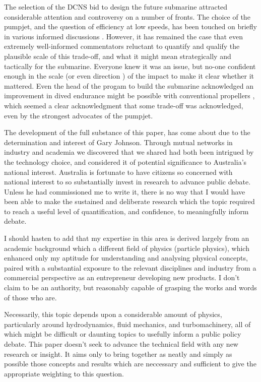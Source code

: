 \documentclass{article}\usepackage[]{graphicx}\usepackage[]{color}
\begin{document}
The selection of the DCNS bid to design the future submarine attracted considerable attention and controversy on a number of fronts. The choice of the pumpjet, and the question of efficiency at low speeds, has been touched on briefly in various informed discussions \parencite{stanford2017} \parencite{davies2017}.  However, it has remained the case that even extremely well-informed commentators reluctant to quantify and qualify the plausible scale of this trade-off, and what it might mean strategically and tactically for the submarine. Everyone knew it was an issue, but no-one confident enough in the scale (or even direction \parencite{davies2017}) of the impact to make it clear whether it mattered. Even the head of the progam to build the submarine acknowledged an improvement in dived endurance might be possible with conventional propellers \parencite{sbs2017}, which seemed a clear acknowledgment that some trade-off was acknowledged, even by the strongest advocates of the pumpjet.

The development of the full substance of this paper, has come about due to the determination and interest of Gary Johnson.  Through mutual networks in industry and academia we discovered that we shared had both been intrigued by the technology choice, and considered it of potential significance to Australia's national interest. Australia is fortunate to have citizens so concerned with national interest to so substantially invest in research to advance public debate.  Unless he had commissioned me to write it, there is no way that I would have been able to make the sustained and deliberate research which the topic required to reach a useful level of quantification, and confidence, to meaningfully inform debate.

I should hasten to add that my expertise in this area is derived largely from an academic background which a different field of physics (particle physics), which enhanced only my aptitude for understanding and analysing physical concepts, paired with a substantial exposure to the relevant disciplines and industry from a commercial perspective as an entrepreneur developing new products.  I don't claim to be an authority, but reasonably capable of grasping the works and words of those who are.

Necessarily, this topic depends upon a considerable amount of physics, particularly around hydrodynamics, fluid mechanics, and turbomachinery, all of which might be difficult or daunting topics to usefully inform a public policy debate.  This paper doesn't seek to advance the technical field with any new research or insight.  It aims only to bring together as neatly and simply as possible those concepts and results which are neccessary and sufficient to give the appropriate weighting to this question.
\end{document}
